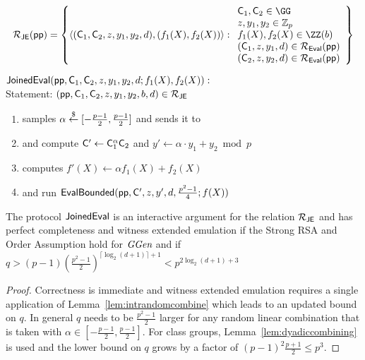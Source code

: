 \[
\mathcal{R_\textsf{JE}}(\params) = \left\lbrace
\langle (\gr{C}_1,\gr{C}_2, z, y_1,y_2,d), (f_1(X), f_2(X)) \rangle
: \\
\begin{array}{l} 
\gr{C}_1, \gr{C}_2 \in \GG \\
z, y_1, y_2 \in \mathbb{Z}_p \\
f_1(X), f_2(X) \in \ZZ(b) \\
(\gr{C}_1,z,y_1,d) \in \mathcal{R_\textsf{Eval}}(\params) \\
(\gr{C}_2,z,y_2,d) \in \mathcal{R_\textsf{Eval}}(\params)
\end{array}
\right\rbrace
\]





\begin{mdframed}
	$\textsf{{JoinedEval}}(\textsf{pp}, \mathsf{C}_1, \mathsf{C}_2, z, y_1, y_2, d; f_1(X),f_2(X)) :$  \\
Statement: $(\textsf{pp},\mathsf{C}_1,\mathsf{C}_2,z,y_1,y_2,b,d)\in \mathcal{R}_{\textsf{{JE}}}$
			\begin{enumerate}[nolistsep]
        \item \verifier samples $\alpha \overset{\$}{\gets} [-\frac{p-1}{2},\frac{p-1}{2}]$ and sends it to \prover
			\item \prover and \verifier compute $\mathsf{C}'\gets \mathsf{C}_1^{\alpha}\mathsf{C}_2$ and $y'\gets \alpha \cdot y_1 +y_2 \bmod p$
			\item \prover computes $f'(X)\gets \alpha f_1(X) +f_2(X)$
			\item \prover and \verifier run $\textsf{{EvalBounded}}(\textsf{pp},\mathsf{C}',z,y',d,\frac{p^2-1}{4};f(X))$
		    \end{enumerate}
\end{mdframed}

\begin{theorem}
\label{thm:joined}
The protocol $\textsf{{JoinedEval}}$ is an interactive argument for the relation $\mathcal{R}_{\textsf{{JE}}}$ and has perfect completeness and witness extended emulation if the Strong RSA and Order Assumption hold for $\textit{GGen}$ and if $q>(p-1)(\frac{p^2-1}{2})^{\lceil \log_2(d+1)\rceil+1}<p^{2\log_2(d+1)+3}$
\end{theorem}
\begin{proof}
    Correctness is immediate and witness extended emulation requires a single application of Lemma~\ref{lem:intrandomcombine} which leads to an updated bound on $q$. In general $q$ needs to be $\frac{p^2-1}{2}$ larger for any random linear combination that is taken with $\alpha \in [-\frac{p-1}{2},\frac{p-1}{2}]$. For class groups, Lemma~\ref{lem:dyadiccombining} is used and the lower bound on $q$ grows by a factor of $(p-1)^2\frac{p+1}{2}\leq p^3$.
\end{proof}

